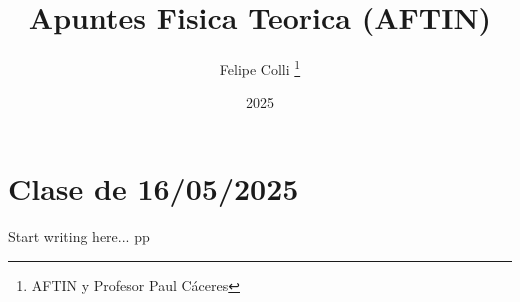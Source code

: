 \documentclass[11pt]{article}
\title{Apuntes Fisica Teorica (AFTIN)}
\author{Felipe Colli \thanks{AFTIN y Profesor Paul Cáceres}}
\date{2025}
\begin{document}
\maketitle
\tableofcontents
\newpage

\section{Clase de 16/05/2025}


Start writing here...
pp
\end{document}
